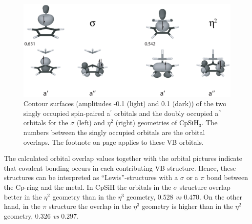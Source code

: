 \begin{figure} [htbp]
\begin{center}
\includegraphics[scale=0.67]{cyclopentadienyl/figures/sih3_sigma.eps}
\end{center}
\caption{Contour surfaces (amplitudes -0.1 (light) and 0.1 (dark)) of the two singly occupied spin-paired a$^\prime$ orbitals and the doubly occupied a$^{\prime\prime}$ orbitals for the $\sigma$ (left) and $\eta^{2}$ (right) geometries of CpSiH$_3$. The numbers between the singly occupied orbitals are the orbital overlaps. The footnote on page \pageref{ch4.foot.consequence} applies to these VB orbitals.}
\label{ch4.fig.sih3}
\end{figure}

The calculated orbital overlap values together with the orbital pictures indicate that covalent bonding occurs in each contributing VB structure. Hence, these structures can be interpreted as ``Lewis''-structures with a $\sigma$ or a $\pi$ bond between the Cp-ring and the metal. In CpSiH the orbitals in the $\sigma$ structure overlap better in the $\eta^2$ geometry than in the $\eta^3$ geometry, 0.528 \textit{vs} 0.470. On the other hand, in the $\pi$ structure the overlap in the $\eta^{3}$ geometry is higher than in the $\eta^{2}$ geometry, 0.326 \textit{vs} 0.297.

